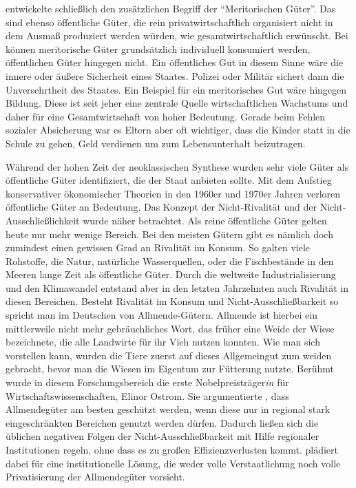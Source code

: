 \textcite{Musgrave1956} entwickelte schließlich den zusätzlichen Begriff der "`Meritorischen Güter"'. Das sind ebenso öffentliche Güter, die rein privatwirtschaftlich organisiert nicht in dem Ausmaß produziert werden würden, wie gesamtwirtschaftlich erwünscht. Bei \textcite{Musgrave1956} können meritorische Güter grundsätzlich individuell konsumiert werden, öffentlichen Güter hingegen nicht. Ein öffentliches Gut in diesem Sinne wäre die innere oder äußere Sicherheit eines Staates. Polizei oder Militär sichert dann die Unversehrtheit des Staates. Ein Beispiel für ein meritorisches Gut wäre hingegen Bildung. Diese ist seit jeher eine zentrale Quelle wirtschaftlichen Wachstums und daher für eine Gesamtwirtschaft von hoher Bedeutung. Gerade beim Fehlen sozialer Absicherung war es Eltern aber oft wichtiger, dass die Kinder statt in die Schule zu gehen, Geld verdienen um zum Lebensunterhalt beizutragen. 

Während der hohen Zeit der neoklassischen Synthese wurden sehr viele Güter als öffentliche Güter identifiziert, die der Staat anbieten sollte. Mit dem Aufstieg konservativer ökonomischer Theorien in den 1960er und 1970er Jahren verloren öffentliche Güter an Bedeutung. Das Konzept der Nicht-Rivalität und der Nicht-Ausschließlichkeit wurde näher betrachtet. Als reine öffentliche Güter gelten heute nur mehr wenige Bereich. Bei den meisten Gütern gibt es nämlich doch zumindest einen gewissen Grad an Rivalität im Konsum. So galten viele Rohstoffe, die Natur, natürliche Wasserquellen, oder die Fischbestände in den Meeren lange Zeit als öffentliche Güter. Durch die weltweite Industrialisierung und den Klimawandel entstand aber in den letzten Jahrzehnten auch Rivalität in diesen Bereichen. Besteht Rivalität im Konsum und Nicht-Ausschließbarkeit so spricht man im Deutschen von Allmende-Gütern. Allmende ist hierbei ein mittlerweile nicht mehr gebräuchliches Wort, das früher eine Weide der Wiese bezeichnete, die alle Landwirte für ihr Vieh nutzen konnten. Wie man sich vorstellen kann, wurden die Tiere zuerst auf dieses Allgemeingut zum weiden gebracht, bevor man die Wiesen im Eigentum zur Fütterung nutzte. Berühmt wurde in diesem Forschungsbereich die erste Nobelpreisträger\textit{in} für Wirtschaftswissenschaften, Elinor Ostrom. Sie argumentierte \parencite{Ostrom1990}, dass Allmendegüter am besten geschützt werden, wenn diese nur in regional stark eingeschränkten Bereichen genutzt werden dürfen. Dadurch ließen sich die üblichen negativen Folgen der Nicht-Ausschließbarkeit mit Hilfe regionaler Institutionen regeln, ohne dass es zu großen Effizienzverlusten kommt. \textcite{Ostrom1990} plädiert dabei für eine institutionelle Lösung, die weder volle Verstaatlichung noch volle Privatisierung der Allmendegüter vorsieht.

